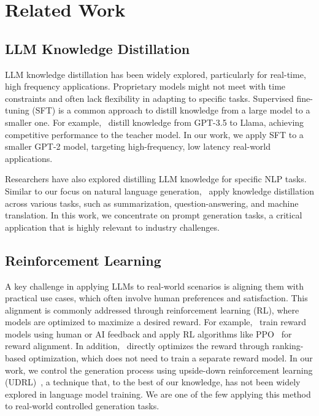 \section{Related Work}
\subsection{LLM Knowledge Distillation}

LLM knowledge distillation has been widely explored, particularly for real-time, high frequency applications. Proprietary models might not meet with time constraints and often lack flexibility in adapting to specific tasks. Supervised fine-tuning (SFT) is a common approach to distill knowledge from a large model to a smaller one. For example,~\citet{alpaca, vicuna} distill knowledge from GPT-3.5 to Llama, achieving competitive performance to the teacher model. In our work, we apply SFT to a smaller GPT-2 model, targeting high-frequency, low latency real-world applications.

Researchers have also explored distilling LLM knowledge for specific NLP tasks. Similar to our focus on natural language generation,~\citet{inheritsumm, recomp, mario, gkd} apply knowledge distillation across various tasks, such as summarization, question-answering, and machine translation. In this work, we concentrate on prompt generation tasks, a critical application that is highly relevant to industry challenges.

\subsection{Reinforcement Learning}

A key challenge in applying LLMs to real-world scenarios is aligning them with practical use cases, which often involve human preferences and satisfaction. This alignment is commonly addressed through reinforcement learning (RL), where models are optimized to maximize a desired reward. For example,~\citet{constitutionalai, ultrafeedback, rlaif, syntheticfeedback} train reward models using human or AI feedback and apply RL algorithms like PPO~\citep{ppo} for reward alignment. In addition,~\citet{dpo} directly optimizes the reward through ranking-based optimization, which does not need to train a separate reward model. In our work, we control the generation process using upside-down reinforcement learning (UDRL)~\citep{udrl0, udrl}, a technique that, to the best of our knowledge, has not been widely explored in language model training. We are one of the few applying this method to real-world controlled generation tasks.
